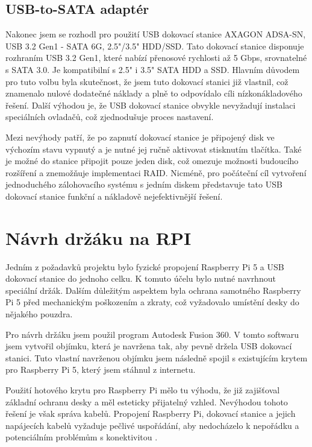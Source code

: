 \documentclass[a4paper,12pt, oneside]{book}
\begin{document}
\subsection{USB-to-SATA adaptér}
Nakonec jsem se rozhodl pro použití USB dokovací stanice AXAGON ADSA-SN, USB 3.2
Gen1 - SATA 6G, 2.5"/3.5" HDD/SSD. Tato dokovací stanice
disponuje rozhraním USB 3.2 Gen1, které nabízí přenosové rychlosti až 5 Gbps,
srovnatelné s SATA 3.0. Je kompatibilní s 2.5" i 3.5" SATA HDD a SSD. Hlavním
důvodem pro tuto volbu byla skutečnost, že jsem tuto dokovací stanici již
vlastnil, což znamenalo nulové dodatečné náklady a plně to
odpovídalo cíli nízkonákladového řešení. Další výhodou je, že USB dokovací
stanice obvykle nevyžadují instalaci speciálních ovladačů,
což zjednodušuje proces nastavení.

Mezi nevýhody patří, že po zapnutí dokovací stanice je připojený disk ve
výchozím stavu vypnutý a je nutné jej ručně aktivovat stisknutím tlačítka. Také
je možné do stanice připojit pouze jeden disk, což omezuje možnosti budoucího
rozšíření a znemožňuje implementaci RAID. Nicméně, pro počáteční cíl vytvoření
jednoduchého zálohovacího systému s jedním diskem představuje tato USB dokovací
stanice funkční a nákladově nejefektivnější řešení.

\section{Návrh držáku na RPI}

Jedním z požadavků projektu bylo fyzické propojení Raspberry Pi 5 a USB dokovací
stanice do jednoho celku. K tomuto účelu bylo nutné navrhnout speciální držák.
Dalším důležitým aspektem byla ochrana samotného Raspberry Pi 5 před mechanickým
poškozením a zkraty, což vyžadovalo umístění desky do nějakého pouzdra.

Pro návrh držáku jsem použil program Autodesk Fusion 360. V tomto softwaru jsem
vytvořil objímku, která je navržena tak, aby pevně držela USB dokovací stanici.
Tuto vlastní navrženou objímku jsem následně spojil s existujícím krytem pro
Raspberry Pi 5, který jsem stáhnul z internetu. 

Použití hotového krytu pro Raspberry Pi mělo tu výhodu, že již zajišťoval
základní ochranu desky a měl esteticky přijatelný vzhled. Nevýhodou tohoto
řešení je však správa kabelů. Propojení Raspberry Pi, dokovací stanice a jejich
napájecích kabelů vyžaduje pečlivé uspořádání, aby nedocházelo k nepořádku a
potenciálním problémům s konektivitou . 
\end{document}
